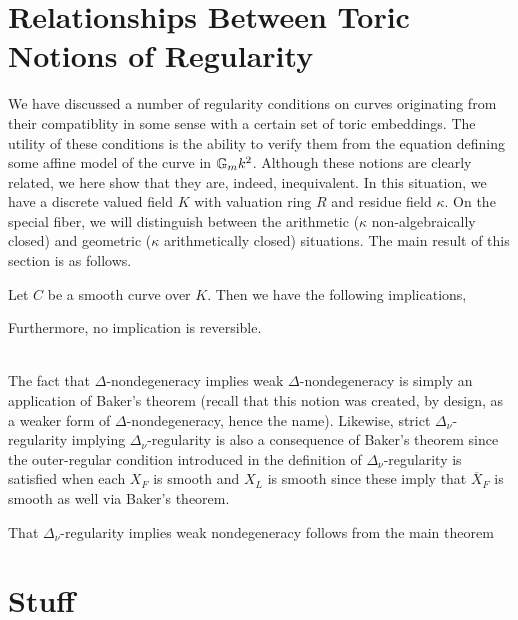 \documentclass[12pt]{article}
\begin{document}
\section{Relationships Between Toric Notions of Regularity}

We have discussed a number of regularity conditions on curves originating from their compatiblity in some sense with a certain set of toric embeddings. The utility of these conditions is the ability to verify them from the equation defining some affine model of the curve in $\mathbb{G}_m{k}^2$. Although these notions are clearly related, we here show that they are, indeed, inequivalent. In this situation, we have a discrete valued field $K$ with valuation ring $R$ and residue field $\kappa$. On the special fiber, we will distinguish between the arithmetic ($\kappa$ non-algebraically closed) and geometric ($\kappa$ arithmetically closed) situations. The main result of this section is as follows.

\begin{prop}
Let $C$ be a smooth curve over $K$. Then we have the following implications,
\begin{center}
\end{center}
Furthermore, no implication is reversible. 
\end{prop}
\noindent\\
The fact that $\Delta$-nondegeneracy implies weak $\Delta$-nondegeneracy is simply an application of Baker's theorem (recall that this notion was created, by design, as a weaker form of $\Delta$-nondegeneracy, hence the name). Likewise, strict $\Delta_\nu$-regularity implying $\Delta_\nu$-regularity is also a consequence of Baker's theorem since the outer-regular condition introduced in the definition of $\Delta_\nu$-regularity is satisfied when each $X_F$ is smooth and $X_L$ is smooth since these imply that $\overline{X}_F$ is smooth as well via Baker's theorem. 
\par
That $\Delta_\nu$-regularity implies weak nondegeneracy follows from the main theorem

\section{Stuff}
\end{document}
